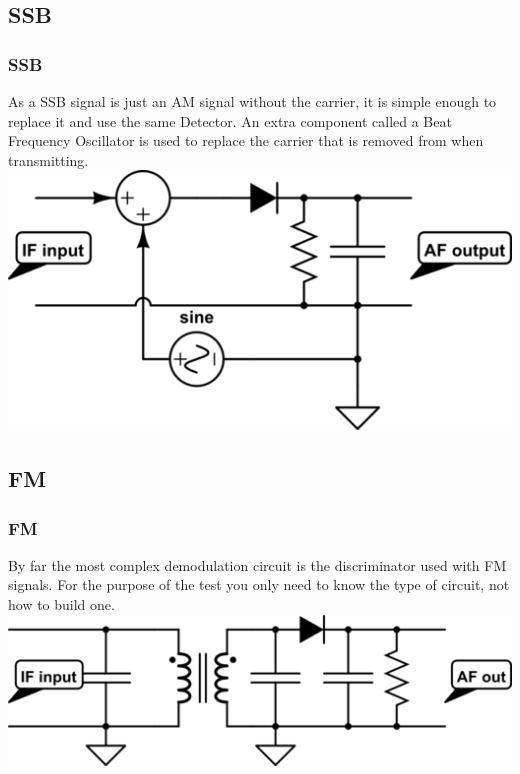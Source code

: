 \documentclass[10pt]{beamer}
\begin{document}
\subsection{SSB}

\begin{frame}
\frametitle{SSB}
As a SSB signal is just an AM signal without the carrier, it is simple enough to replace it and use the same Detector. An extra component called a Beat Frequency Oscillator is used to replace the carrier that is removed from when transmitting.
\includegraphics[width=.9\textwidth]{simpleproductdetector.png}
\end{frame}

\subsection{FM}
\begin{frame}
\frametitle{FM}
By far the most complex demodulation circuit is the discriminator used with FM signals. For the purpose of the test you only need to know the type of circuit, not how to build one. 
\includegraphics[width=.9\textwidth]{simplediscriminator.png}
\end{frame}
\end{document}
